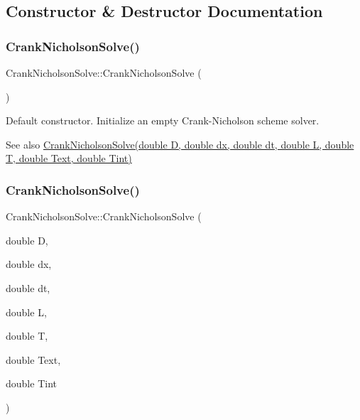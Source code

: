 \subsection{Constructor \& Destructor Documentation}
\mbox{\label{class_crank_nicholson_solve_a2c3330fe7e6925da4148d314280ed021}} 
\subsubsection{\texorpdfstring{Crank\+Nicholson\+Solve()}{CrankNicholsonSolve()}\hspace{0.1cm}{\footnotesize\ttfamily [1/2]}}
{\footnotesize\ttfamily Crank\+Nicholson\+Solve\+::\+Crank\+Nicholson\+Solve (\begin{DoxyParamCaption}{ }\end{DoxyParamCaption})\hspace{0.3cm}{\ttfamily [inline]}}

Default constructor. Initialize an empty Crank-\/\+Nicholson scheme solver. \begin{DoxySeeAlso}{See also}
\hyperlink{class_crank_nicholson_solve_a0608d2d606626bf02c580f87b5a467ed}{Crank\+Nicholson\+Solve(double D, double dx, double dt, double L, double T, double Text, double Tint)} 
\end{DoxySeeAlso}
\mbox{\label{class_crank_nicholson_solve_a0608d2d606626bf02c580f87b5a467ed}} 
\subsubsection{\texorpdfstring{Crank\+Nicholson\+Solve()}{CrankNicholsonSolve()}\hspace{0.1cm}{\footnotesize\ttfamily [2/2]}}
{\footnotesize\ttfamily Crank\+Nicholson\+Solve\+::\+Crank\+Nicholson\+Solve (\begin{DoxyParamCaption}\item[{double}]{D,  }\item[{double}]{dx,  }\item[{double}]{dt,  }\item[{double}]{L,  }\item[{double}]{T,  }\item[{double}]{Text,  }\item[{double}]{Tint }\end{DoxyParamCaption})\hspace{0.3cm}{\ttfamily [inline]}}

